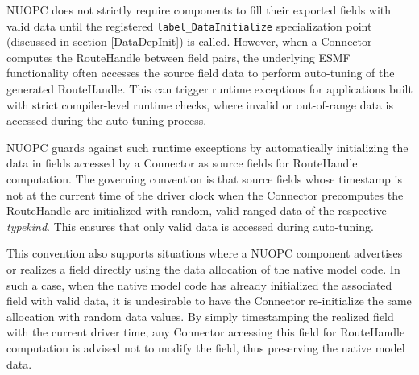 %

\label{DataConsiderInit}

NUOPC does not strictly require components to fill their exported fields with valid data until the registered {\tt label\_DataInitialize} specialization point (discussed in section \ref{DataDepInit}) is called. However, when a Connector computes the RouteHandle between field pairs, the underlying ESMF functionality often accesses the source field data to perform auto-tuning of the generated RouteHandle. This can trigger runtime exceptions for applications built with strict compiler-level runtime checks, where invalid or out-of-range data is accessed during the auto-tuning process.

NUOPC guards against such runtime exceptions by automatically initializing the data in fields accessed by a Connector as source fields for RouteHandle computation. The governing convention is that source fields whose timestamp is not at the current time of the driver clock when the Connector precomputes the RouteHandle are initialized with random, valid-ranged data of the respective {\em typekind}. This ensures that only valid data is accessed during auto-tuning.

This convention also supports situations where a NUOPC component advertises or realizes a field directly using the data allocation of the native model code. In such a case, when the native model code has already initialized the associated field with valid data, it is undesirable to have the Connector re-initialize the same allocation with random data values. By simply timestamping the realized field with the current driver time, any Connector accessing this field for RouteHandle computation is advised not to modify the field, thus preserving the native model data.
